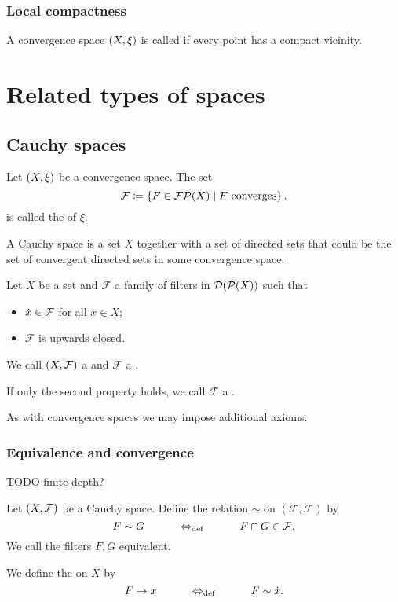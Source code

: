 \subsection{Local compactness}
\begin{definition}
A convergence space $\left( X, \xi \right)$ is called 
if every point has a compact vicinity.
\end{definition}

\chapter{Related types of spaces}
\section{Cauchy spaces}
\begin{definition}
Let $\left( X,\xi \right)$ be a convergence space. The set
\[ \mathcal{F} \coloneqq \left\{ F\in\operatorname{\mathcal{FP}}(X) \;\middle|\; \text{$F$ converges} \right\}. \]
is called the  of $\xi$.
\end{definition}
A Cauchy space is a set $X$ together with a set of directed sets that could be the set of convergent directed sets in some convergence space.
\begin{definition}
Let $X$ be a set and $\mathcal{F}$ a family of filters in $\operatorname{\mathcal{D}}(\operatorname{\mathcal{P}}(X))$ such that
\begin{itemize}
\item $\dot{x} \in \mathcal{F}$ for all $x\in X$;
\item $\mathcal{F}$ is upwards closed.
\end{itemize}
We call $\left( X, \mathcal{F} \right)$ a  and $\mathcal{F}$ a .

If only the second property holds, we call $\mathcal{F}$ a .
\end{definition}
As with convergence spaces we may impose additional axioms.

\subsection{Equivalence and convergence}
TODO finite depth?
\begin{definition}
Let $\left( X, \mathcal{F} \right)$ be a Cauchy space. Define the relation $\sim$ on $(\mathcal{F},\mathcal{F})$ by
\[ F \sim G \qquad \quad\Leftrightarrow_{\text{def}}\quad \qquad F\cap G \in \mathcal{F}. \]
We call the filters $F,G$ equivalent.

We define the  on $X$ by
\[ F \to x \qquad \quad\Leftrightarrow_{\text{def}}\quad \qquad F \sim \dot{x}. \]
\end{definition}

